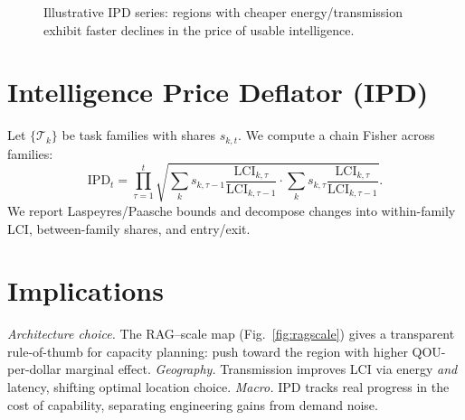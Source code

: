 \documentclass[12pt]{article}
\numberwithin{equation}{section}
\newcommand{\LCI}{\mathrm{LCI}}
\newcommand{\IPD}{\mathrm{IPD}}
\begin{document}
\begin{figure}[t]
\centering
{}
\caption{Illustrative IPD series: regions with cheaper energy/transmission exhibit faster declines in the price of usable intelligence.}
\label{fig:ipd}
\end{figure}

\section{Intelligence Price Deflator (IPD)}

Let $\{\mathcal T_k\}$ be task families with shares $s_{k,t}$.  
We compute a chain Fisher across families:
\begin{equation}
\IPD_t
=\prod_{\tau=1}^{t}
\sqrt{
\sum_k s_{k,\tau-1}\frac{\LCI_{k,\tau}}{\LCI_{k,\tau-1}}
\cdot
\sum_k s_{k,\tau}\frac{\LCI_{k,\tau}}{\LCI_{k,\tau-1}}
}.
\end{equation}
We report Laspeyres/Paasche bounds and decompose changes into within-family LCI, between-family shares, and entry/exit.

\section{Implications}

\textit{Architecture choice.} The RAG–scale map (Fig.~\ref{fig:ragscale}) gives a transparent rule-of-thumb for capacity planning: push toward the region with higher QOU-per-dollar marginal effect.  
\textit{Geography.} Transmission improves LCI via energy \emph{and} latency, shifting optimal location choice.  
\textit{Macro.} IPD tracks real progress in the cost of capability, separating engineering gains from demand noise.

\end{document}
